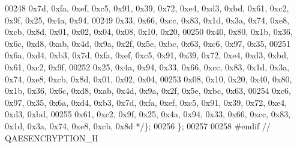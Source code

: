 \begin{DoxyCode}
00248 \textcolor{comment}{        0x7d, 0xfa, 0xef, 0xc5, 0x91, 0x39, 0x72, 0xe4, 0xd3, 0xbd, 0x61, 0xc2, 0x9f, 0x25, 0x4a, 0x94,}
00249 \textcolor{comment}{        0x33, 0x66, 0xcc, 0x83, 0x1d, 0x3a, 0x74, 0xe8, 0xcb, 0x8d, 0x01, 0x02, 0x04, 0x08, 0x10, 0x20,}
00250 \textcolor{comment}{        0x40, 0x80, 0x1b, 0x36, 0x6c, 0xd8, 0xab, 0x4d, 0x9a, 0x2f, 0x5e, 0xbc, 0x63, 0xc6, 0x97, 0x35,}
00251 \textcolor{comment}{        0x6a, 0xd4, 0xb3, 0x7d, 0xfa, 0xef, 0xc5, 0x91, 0x39, 0x72, 0xe4, 0xd3, 0xbd, 0x61, 0xc2, 0x9f,}
00252 \textcolor{comment}{        0x25, 0x4a, 0x94, 0x33, 0x66, 0xcc, 0x83, 0x1d, 0x3a, 0x74, 0xe8, 0xcb, 0x8d, 0x01, 0x02, 0x04,}
00253 \textcolor{comment}{        0x08, 0x10, 0x20, 0x40, 0x80, 0x1b, 0x36, 0x6c, 0xd8, 0xab, 0x4d, 0x9a, 0x2f, 0x5e, 0xbc, 0x63,}
00254 \textcolor{comment}{        0xc6, 0x97, 0x35, 0x6a, 0xd4, 0xb3, 0x7d, 0xfa, 0xef, 0xc5, 0x91, 0x39, 0x72, 0xe4, 0xd3, 0xbd,}
00255 \textcolor{comment}{            0x61, 0xc2, 0x9f, 0x25, 0x4a, 0x94, 0x33, 0x66, 0xcc, 0x83, 0x1d, 0x3a, 0x74, 0xe8, 0xcb, 0x8d 
      */}\};
00256 \};
00257 
00258 \textcolor{preprocessor}{#endif // QAESENCRYPTION\_H}
\end{DoxyCode}
